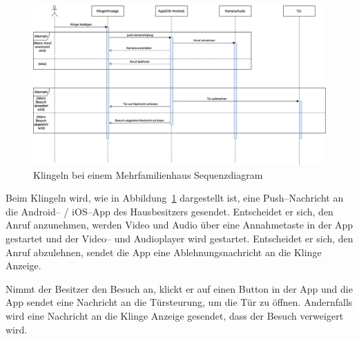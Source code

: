 \begin{figure}[ht!]
    \centering
    \includegraphics[width=\paperwidth-2in]{../assets/img/Klingeln bei Mehrfamilienhaus(Sequenzdiagram).drawio}
    \caption{Klingeln bei einem Mehrfamilienhaus Sequenzdiagram}
    \label{fig:klingeln-bei-einem-mehrfamilienhaus-sequenz-diagram}
\end{figure}
Beim Klingeln wird, wie in Abbildung~\ref{fig:klingeln-bei-einem-mehrfamilienhaus-sequenz-diagram} dargestellt ist, eine Push--Nachricht an die Android-- / iOS--App des Hausbesitzers gesendet.
Entscheidet er sich, den Anruf anzunehmen, werden Video und Audio über eine Annahmetaste in der App gestartet und der Video-- und Audioplayer wird gestartet.
Entscheidet er sich, den Anruf abzulehnen, sendet die App eine Ablehnungsnachricht an die Klinge Anzeige.


Nimmt der Besitzer den Besuch an, klickt er auf einen Button in der App und die App sendet eine Nachricht an die Türsteurung, um die Tür zu öffnen.
Andernfalls wird eine Nachricht an die Klinge Anzeige gesendet, dass der Besuch verweigert wird.